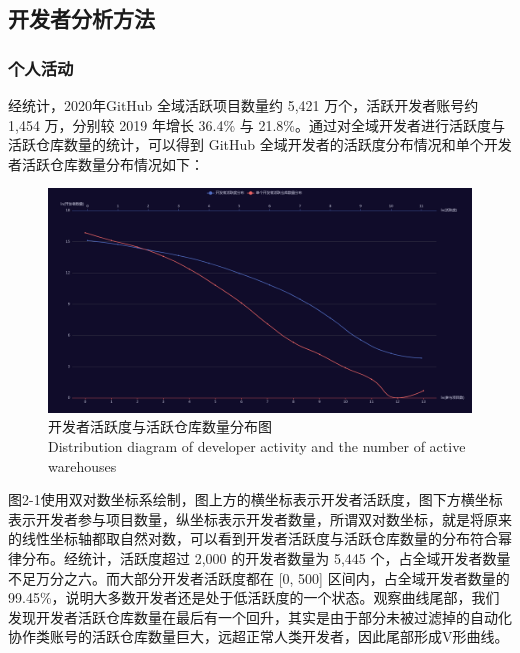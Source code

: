 
\subsection{开发者分析方法}
\subsubsection{个人活动}

\par 经统计，2020年GitHub 全域活跃项目数量约 5,421 万个，活跃开发者账号约 1,454 万，分别较 2019 年增长 36.4\% 与 21.8\%。通过对全域开发者进行活跃度与活跃仓库数量的统计，可以得到 GitHub 全域开发者的活跃度分布情况和单个开发者活跃仓库数量分布情况如下：
\begin{figure}[H]
    \centering
    \includegraphics[width=130mm]{./figures/image2-1.png}
    \caption{开发者活跃度与活跃仓库数量分布图\\Distribution diagram of developer activity and the number of active warehouses}
\end{figure}

\par 图2-1使用双对数坐标系绘制，图上方的横坐标表示开发者活跃度，图下方横坐标表示开发者参与项目数量，纵坐标表示开发者数量，所谓双对数坐标，就是将原来的线性坐标轴都取自然对数，可以看到开发者活跃度与活跃仓库数量的分布符合幂律分布。经统计，活跃度超过 2,000 的开发者数量为 5,445 个，占全域开发者数量不足万分之六。而大部分开发者活跃度都在 [0, 500] 区间内，占全域开发者数量的 99.45\%，说明大多数开发者还是处于低活跃度的一个状态。观察曲线尾部，我们发现开发者活跃仓库数量在最后有一个回升，其实是由于部分未被过滤掉的自动化协作类账号的活跃仓库数量巨大，远超正常人类开发者，因此尾部形成V形曲线。





